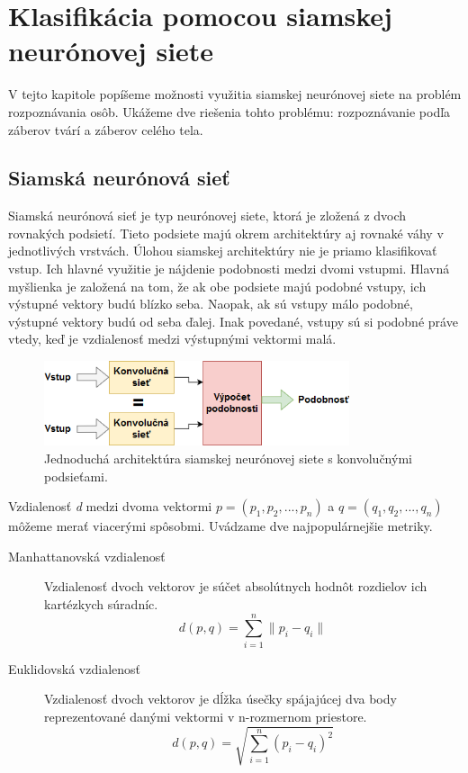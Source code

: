 \chapter{Klasifikácia pomocou siamskej neurónovej siete}
\label{kap:siamese}
V tejto kapitole popíšeme možnosti využitia siamskej neurónovej siete na problém rozpoznávania osôb.
Ukážeme dve riešenia tohto problému: rozpoznávanie podľa záberov tvárí a záberov celého tela.

\section{Siamská neurónová sieť}
Siamská neurónová sieť je typ neurónovej siete, ktorá je zložená z dvoch rovnakých podsietí. 
Tieto podsiete majú okrem architektúry aj rovnaké váhy v jednotlivých vrstvách.
Úlohou siamskej architektúry nie je priamo klasifikovať vstup.
Ich hlavné využitie je nájdenie podobnosti medzi dvomi vstupmi.
Hlavná myšlienka je založená na tom, že ak obe podsiete majú podobné vstupy, ich výstupné vektory budú blízko seba.
Naopak, ak sú vstupy málo podobné, výstupné vektory budú od seba ďalej.
Inak povedané, vstupy sú si podobné práve vtedy, keď je vzdialenosť medzi výstupnými vektormi malá.

\begin{figure}[H]
\centerline{\includegraphics[width=0.8\textwidth]{images/siamese_diagram}}
\caption[Siamska neurónová sieť]{Jednoduchá architektúra siamskej neurónovej siete s konvolučnými podsieťami.}
\label{obr:siamese_diagram}
\end{figure}

Vzdialenosť \textit{d} medzi dvoma vektormi $p = (p_1, p_2, ..., p_n)$ a $q = (q_1, q_2, ..., q_n)$ 
môžeme merať viacerými spôsobmi. Uvádzame dve najpopulárnejšie metriky.

\begin{description}
\item[Manhattanovská vzdialenosť]
Vzdialenosť dvoch vektorov je súčet absolútnych hodnôt rozdielov ich kartézkych súradníc.
$$d(p, q) = \sum_{i=1}^{n} \| p_i - q_i \|$$

\item[Euklidovská vzdialenosť]
Vzdialenosť dvoch vektorov je dĺžka úsečky spájajúcej dva body reprezentované danými vektormi v n-rozmernom priestore.
$$d(p, q) = \sqrt{ \sum_{i=1}^{n} ( p_i - q_i )^2}$$
\end{description}


